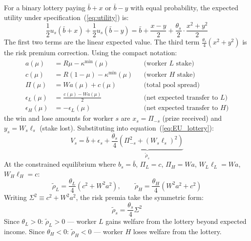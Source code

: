 \documentclass[12pt,a4paper]{article}
\begin{document}
For a binary lottery paying $\bar{b} + x$ or $\bar{b} - y$ with equal
probability, the expected utility under specification~(\ref{eq:utility})
is:
\begin{equation}
  \frac{1}{2}u_s(\bar{b}+x) + \frac{1}{2}u_s(\bar{b}-y)
  = \bar{b} + \frac{x-y}{2}
    + \frac{\theta_s}{2}\cdot\frac{x^2+y^2}{2}
  \label{eq:EU_lottery}
\end{equation}
The first two terms are the linear expected value. The third term
$\frac{\theta_s}{4}(x^2 + y^2)$ is the risk premium correction.
Using the compact notation:
\begin{align}
  a(\mu) &= R\mu - \kappa^{\min}(\mu)
  && \text{(worker $L$ stake)} \label{eq:a} \\
  c(\mu) &= R(1-\mu) - \kappa^{\min}(\mu)
  && \text{(worker $H$ stake)} \label{eq:c} \\
  \Pi(\mu) &= Wa(\mu) + c(\mu)
  && \text{(total pool spread)} \label{eq:Pi} \\
  \epsilon_L(\mu) &= \tfrac{c(\mu) - Wa(\mu)}{2}
  && \text{(net expected transfer to $L$)} \label{eq:epsilonL} \\
  \epsilon_H(\mu) &= -\epsilon_L(\mu)
  && \text{(net expected transfer to $H$)} \label{eq:epsilonH}
\end{align}
the win and lose amounts for worker $s$ are
$x_s = \Pi_{-s}$ (prize received) and $y_s = W_s\ell_s$ (stake lost).
Substituting into equation~(\ref{eq:EU_lottery}):
\begin{equation}
  V_s = \bar{b} + \epsilon_s
        + \underbrace{\frac{\theta_s}{4}
        \!\left(\Pi_{-s}^2 + (W_s\ell_s)^2\right)}_{\tilde\rho_s}
  \label{eq:Vs_full}
\end{equation}
At the constrained equilibrium where $b_s = \bar{b}$,
$\Pi_L = c$, $\Pi_H = Wa$, $W_L\ell_L = Wa$, $W_H\ell_H = c$:
\begin{equation}
  \tilde\rho_L = \frac{\theta_L}{4}(c^2 + W^2a^2),
  \qquad
  \tilde\rho_H = \frac{\theta_H}{4}(W^2a^2 + c^2)
  \label{eq:rho_explicit}
\end{equation}
Writing $\Sigma^2 \equiv c^2 + W^2a^2$, the risk premia take the
symmetric form:
\begin{equation}
  \boxed{\tilde\rho_s = \frac{\theta_s}{4}\Sigma^2}
  \label{eq:rho_simple}
\end{equation}
Since $\theta_L > 0$: $\tilde\rho_L > 0$ --- worker $L$ gains welfare
from the lottery beyond expected income. Since $\theta_H < 0$:
$\tilde\rho_H < 0$ --- worker $H$ loses welfare from the lottery.
\end{document}
